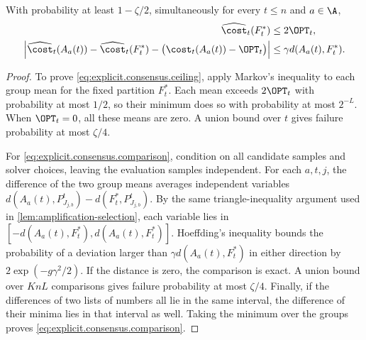 \begin{lemma}\label{lem:explicit.estimated.costs}
With probability at least $ 1-\zeta/2 $, simultaneously for every $ t\le n $ and $ a\in\A $,
\begin{align}
    \edcost{t}(F_t^*)&\le2\OPT_t,\label{eq:explicit.consensus.ceiling}\\
    \left|
        \edcost{t}(A_a(t))-\edcost{t}(F_t^*)
        -\bigl(\cost_t(A_a(t))-\OPT_t\bigr)
    \right|
    &\le\gamma d(A_a(t),F_t^*).
    \label{eq:explicit.consensus.comparison}
\end{align}
\end{lemma}
\begin{proof}
To prove \eqref{eq:explicit.consensus.ceiling}, apply Markov's inequality to each group mean for the fixed partition $ F_t^* $.
Each mean exceeds $ 2\OPT_t $ with probability at most $ 1/2 $, so their minimum does so with probability at most $ 2^{-L} $.
When $ \OPT_t=0 $, all these means are zero.
A union bound over $ t $ gives failure probability at most $ \zeta/4 $.

For \eqref{eq:explicit.consensus.comparison}, condition on all candidate samples and solver choices, leaving the evaluation samples independent.
For each $ a,t,j $, the difference of the two group means averages independent variables $ d(A_a(t),P_{J_{j,b}}^t)-d(F_t^*,P_{J_{j,b}}^t) $.
By the same triangle-inequality argument used in \cref{lem:amplification-selection}, each variable lies in $ [-d(A_a(t),F_t^*),d(A_a(t),F_t^*)] $.
Hoeffding's inequality bounds the probability of a deviation larger than $ \gamma d(A_a(t),F_t^*) $ in either direction by $ 2\exp(-g\gamma^2/2) $.
If the distance is zero, the comparison is exact.
A union bound over $ KnL $ comparisons gives failure probability at most $ \zeta/4 $.
Finally, if the differences of two lists of numbers all lie in the same interval, the difference of their minima lies in that interval as well.
Taking the minimum over the groups proves \eqref{eq:explicit.consensus.comparison}.

\end{proof}

